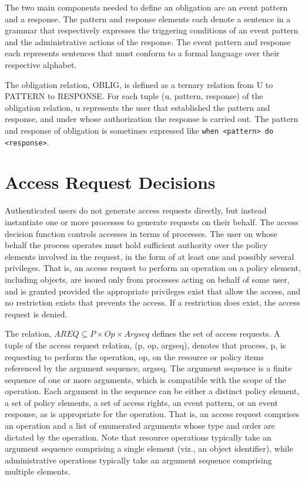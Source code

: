 \documentclass[12pt,a4paper,titlepage]{book}
\begin{document}
	The two main components needed to define an obligation are an event pattern and a response. The pattern and response elements each denote a sentence in a grammar that respectively expresses the triggering conditions of an event pattern and the administrative actions of the response. The event pattern and response each represents sentences that must conform to a formal language over their respective alphabet.
	
	The obligation relation, OBLIG, is defined as a ternary relation from U to PATTERN to RESPONSE. For each tuple (u, pattern, response) of the obligation relation, u represents the user that established the pattern and response, and under whose authorization the response is carried out. The pattern and response of obligation is sometimes expressed like \lstinline|when <pattern> do <response>|.
	
	\section{Access Request Decisions}
	
	Authenticated users do not generate access requests directly, but instead instantiate one or more processes to generate requests on their behalf. The access decision function controls accesses in terms of processes. The user on whose behalf the process operates must hold sufficient authority over the policy elements involved in the request, in the form of at least one and possibly several privileges. That is, an access request to perform an operation on a policy element, including objects, are issued only from processes acting on behalf of some user, and is granted provided the appropriate privileges exist that allow the access, and no restriction exists that prevents the access. If a restriction does exist, the access request is denied.
	
	The relation, $ AREQ \subseteq P \times Op \times Argseq $ defines the set of access requests. A tuple of the access request relation, (p, op, argseq), denotes that process, p, is requesting to perform the operation, op, on the resource or policy items referenced by the argument sequence, argseq. The argument sequence is a finite sequence of one or more arguments, which is compatible with the scope of the operation. Each argument in the sequence can be either a distinct policy element, a set of policy elements, a set of access rights, an event pattern, or an event response, as is appropriate for the operation. That is, an access request comprises an operation and a list of enumerated arguments whose type and order are dictated by the operation. Note that resource operations typically take an argument sequence comprising a single element (viz., an object identifier), while administrative operations typically take an argument sequence comprising multiple elements.
	
\end{document}
